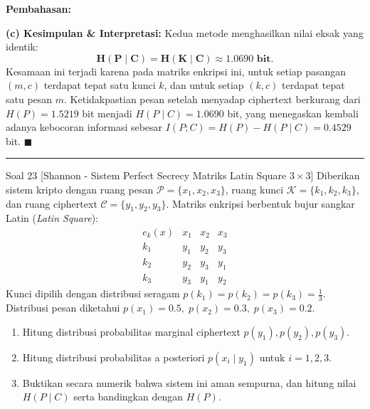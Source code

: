 \documentclass[11pt,a4paper]{article}
\newenvironment{solusi}{\noindent\textbf{\textsf{Pembahasan:}}\par\vspace{0.2em}}{\hfill$\blacksquare$\vspace{1em}\par\hrule\vspace{1em}}
\begin{document}
\begin{solusi}
\vspace{0.2cm}
\textbf{(c) Kesimpulan \& Interpretasi:}
Kedua metode menghasilkan nilai eksak yang identik:
\[
\mathbf{H(P \mid C) = H(K \mid C) \approx 1.0690 \text{ bit}}.
\]
Kesamaan ini terjadi karena pada matriks enkripsi ini, untuk setiap pasangan $(m, c)$ terdapat tepat satu kunci $k$, dan untuk setiap $(k, c)$ terdapat tepat satu pesan $m$.
Ketidakpastian pesan setelah menyadap ciphertext berkurang dari $H(P) = 1.5219$ bit menjadi $H(P \mid C) = 1.0690$ bit, yang menegaskan kembali adanya kebocoran informasi sebesar $I(P; C) = H(P) - H(P \mid C) = 0.4529$ bit.
\end{solusi}


\begin{soalshannon}{Soal 23 [Shannon - Sistem Perfect Secrecy Matriks Latin Square $3 \times 3$]}
Diberikan sistem kripto dengan ruang pesan $\mathcal{P} = \{x_1, x_2, x_3\}$, ruang kunci $\mathcal{K} = \{k_1, k_2, k_3\}$, dan ruang ciphertext $\mathcal{C} = \{y_1, y_2, y_3\}$.
Matriks enkripsi berbentuk bujur sangkar Latin (\textit{Latin Square}):
\[
\begin{array}{c|ccc}
e_k(x) & x_1 & x_2 & x_3 \\ \hline
k_1 & y_1 & y_2 & y_3 \\
k_2 & y_2 & y_3 & y_1 \\
k_3 & y_3 & y_1 & y_2
\end{array}
\]
Kunci dipilih dengan distribusi seragam $p(k_1) = p(k_2) = p(k_3) = \frac{1}{3}$.
Distribusi pesan diketahui $p(x_1) = 0.5, \; p(x_2) = 0.3, \; p(x_3) = 0.2$.
\begin{enumerate}[label=(\alph*)]
    \item Hitung distribusi probabilitas marginal ciphertext $p(y_1), p(y_2), p(y_3)$.
    \item Hitung distribusi probabilitas a posteriori $p(x_i \mid y_1)$ untuk $i = 1, 2, 3$.
    \item Buktikan secara numerik bahwa sistem ini aman sempurna, dan hitung nilai $H(P \mid C)$ serta bandingkan dengan $H(P)$.
\end{enumerate}
\end{soalshannon}
\end{document}
